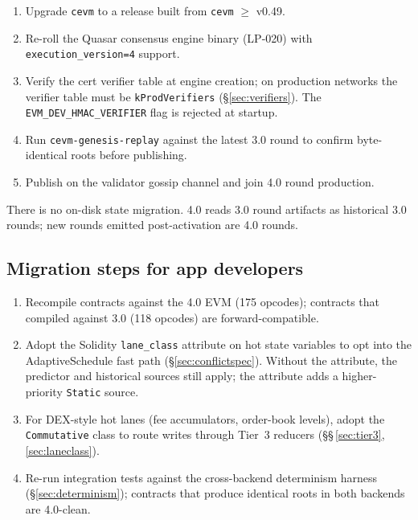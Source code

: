 \begin{enumerate}[leftmargin=2em]
\item Upgrade \texttt{cevm} to a release built from \texttt{cevm}
      $\geq$ v0.49.
\item Re-roll the Quasar consensus engine binary (LP-020) with
      \texttt{execution\_version=4} support.
\item Verify the cert verifier table at engine creation; on production
      networks the verifier table must be \texttt{kProdVerifiers}
      (\S\ref{sec:verifiers}). The \texttt{EVM\_DEV\_HMAC\_VERIFIER}
      flag is rejected at startup.
\item Run \texttt{cevm-genesis-replay} against the latest 3.0 round to
      confirm byte-identical roots before publishing.
\item Publish on the validator gossip channel and join 4.0 round
      production.
\end{enumerate}

There is no on-disk state migration. 4.0 reads 3.0 round artifacts as
historical 3.0 rounds; new rounds emitted post-activation are 4.0
rounds.

\subsection{Migration steps for app developers}

\begin{enumerate}[leftmargin=2em]
\item Recompile contracts against the 4.0 EVM (175 opcodes); contracts
      that compiled against 3.0 (118 opcodes) are forward-compatible.
\item Adopt the Solidity \texttt{lane\_class} attribute on hot state
      variables to opt into the AdaptiveSchedule fast path
      (\S\ref{sec:conflictspec}). Without the attribute, the predictor
      and historical sources still apply; the attribute adds a
      higher-priority \texttt{Static} source.
\item For DEX-style hot lanes (fee accumulators, order-book levels),
      adopt the \texttt{Commutative} class to route writes through
      Tier~3 reducers (\S\S\,\ref{sec:tier3}, \ref{sec:laneclass}).
\item Re-run integration tests against the cross-backend determinism
      harness (\S\ref{sec:determinism}); contracts that produce
      identical roots in both backends are 4.0-clean.
\end{enumerate}

